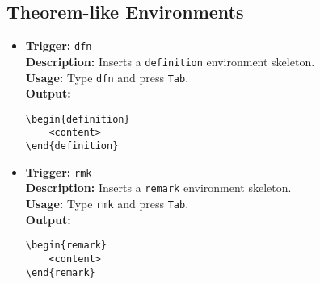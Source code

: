 \documentclass{article}
\begin{document}
\subsection{Theorem-like Environments}
\begin{itemize}[leftmargin=*, label={}]
\item \textbf{Trigger:} \texttt{dfn} \\
\textbf{Description:} Inserts a \texttt{definition} environment skeleton. \\
\textbf{Usage:} Type \texttt{dfn} and press \texttt{Tab}. \\
\textbf{Output:}
\begin{verbatim}
\begin{definition}
    <content>
\end{definition}
\end{verbatim}

\item \textbf{Trigger:} \texttt{rmk} \\
\textbf{Description:} Inserts a \texttt{remark} environment skeleton. \\
\textbf{Usage:} Type \texttt{rmk} and press \texttt{Tab}. \\
\textbf{Output:}
\begin{verbatim}
\begin{remark}
    <content>
\end{remark}
\end{verbatim}
\end{itemize}
\end{document}
